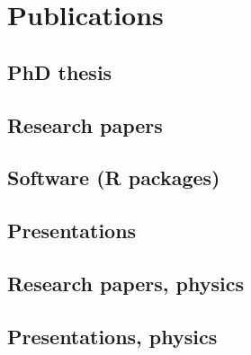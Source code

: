 \documentclass[10pt,a4paper,]{article}
\newcounter{papers}
\begin{document}
\hypertarget{publications}{%
\section{Publications}\label{publications}}

\hypertarget{phd-thesis}{%
\subsection{PhD thesis}\label{phd-thesis}}

\hypertarget{research-papers}{%
\subsection{Research papers}\label{research-papers}}

\newrefcontext[sorting=none]\setcounter{papers}{0}\pagebreak[3]
\printbibliography[category=bib-C:/Users/Nicholas Spyrison/Documents/R/CV/nssPubs.bib-4089067,heading=none]\setcounter{papers}{0}

\nocite{spyrison_spinifex_2020}

\hypertarget{software-r-packages}{%
\subsection{Software (R packages)}\label{software-r-packages}}

\hypertarget{presentations}{%
\subsection{Presentations}\label{presentations}}

\hypertarget{research-papers-physics}{%
\subsection{Research papers, physics}\label{research-papers-physics}}

\hypertarget{presentations-physics}{%
\subsection{Presentations, physics}\label{presentations-physics}}
\end{document}

